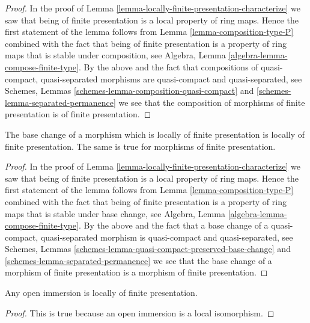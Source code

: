 \begin{proof}
In the proof of Lemma \ref{lemma-locally-finite-presentation-characterize}
we saw that being of finite presentation is a local property of ring maps.
Hence the first statement of the lemma follows from
Lemma \ref{lemma-composition-type-P} combined
with the fact that being of finite presentation
is a property of ring maps that is
stable under composition, see
Algebra, Lemma \ref{algebra-lemma-compose-finite-type}.
By the above and the fact that compositions of
quasi-compact, quasi-separated morphisms are
quasi-compact and quasi-separated, see
Schemes, Lemmas \ref{schemes-lemma-composition-quasi-compact}
and \ref{schemes-lemma-separated-permanence}
we see that the composition of morphisms of finite presentation is
of finite presentation.
\end{proof}

\begin{lemma}
\label{lemma-base-change-finite-presentation}
The base change of a morphism which is locally of finite presentation
is locally of finite presentation. The same is true for morphisms of
finite presentation.
\end{lemma}

\begin{proof}
In the proof of Lemma \ref{lemma-locally-finite-presentation-characterize}
we saw that being of finite presentation is a local property of ring maps.
Hence the first statement of the lemma follows from
Lemma \ref{lemma-composition-type-P} combined
with the fact that being of finite presentation
is a property of ring maps that is
stable under base change, see
Algebra, Lemma \ref{algebra-lemma-compose-finite-type}.
By the above and the fact that a base change of a
quasi-compact, quasi-separated morphism is quasi-compact
and quasi-separated, see
Schemes, Lemmas \ref{schemes-lemma-quasi-compact-preserved-base-change}
and \ref{schemes-lemma-separated-permanence}
we see that the base change of a morphism of finite presentation is
a morphism of finite presentation.
\end{proof}

\begin{lemma}
\label{lemma-open-immersion-locally-finite-presentation}
Any open immersion is locally of finite presentation.
\end{lemma}

\begin{proof}
This is true because an open immersion is a local isomorphism.
\end{proof}

